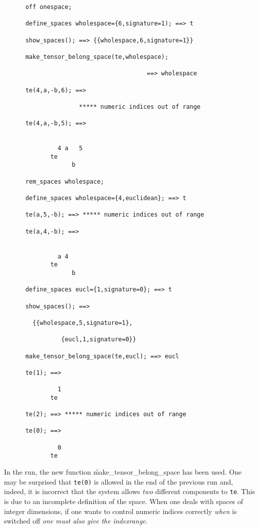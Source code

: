 \begin{verbatim}
      off onespace;

      define_spaces wholespace={6,signature=1); ==> t

      show_spaces(); ==> {{wholespace,6,signature=1}}

      make_tensor_belong_space(te,wholespace);

                                        ==> wholespace

      te(4,a,-b,6); ==>

                     ***** numeric indices out of range

      te(4,a,-b,5); ==>


               4 a   5
             te
                   b

      rem_spaces wholespace;

      define_spaces wholespace={4,euclidean}; ==> t

      te(a,5,-b); ==> ***** numeric indices out of range

      te(a,4,-b); ==>


               a 4
             te
                   b

      define_spaces eucl={1,signature=0}; ==> t

      show_spaces(); ==>

        {{wholespace,5,signature=1},

                {eucl,1,signature=0}}

      make_tensor_belong_space(te,eucl); ==> eucl

      te(1); ==>

               1
             te

      te(2); ==> ***** numeric indices out of range

      te(0); ==>

               0
             te
\end{verbatim} 
In the run, the new function 
\f{make\_tensor\_belong\_space}
has been used.
One may be surprised that \texttt{te(0)} is allowed in the end of
the previous run and, indeed,
it is incorrect that the system allows \emph{two} different components to
\texttt{te}.
This is due to an incomplete definition of the space. When one deals
with spaces of integer dimensions, if one wants to control numeric indices
correctly \emph{when}  is switched off \emph{one must also give the
indexrange}.

